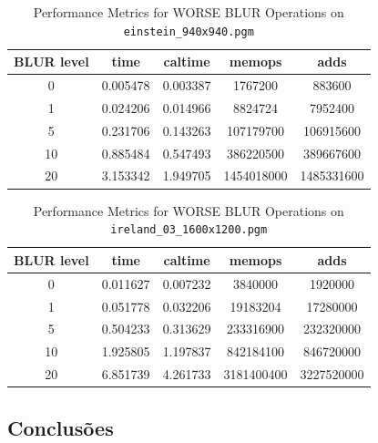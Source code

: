\documentclass{report}
\begin{document}
\begin{table}[h]
    \centering
    \begin{tabular}{ccccc}
        \toprule
        \textbf{BLUR level} & \textbf{time} & \textbf{caltime} & \textbf{memops} & \textbf{adds} \\
        \midrule
        0 & 0.005478 & 0.003387 & 1767200 & 883600 \\
        1 & 0.024206 & 0.014966 & 8824724 & 7952400 \\
        5 & 0.231706 & 0.143263 & 107179700 & 106915600 \\
        10 & 0.885484 & 0.547493 & 386220500 & 389667600 \\
        20 & 3.153342 & 1.949705 & 1454018000 & 1485331600 \\
        \bottomrule
    \end{tabular}
    \caption*{Performance Metrics for WORSE BLUR Operations on \texttt{einstein\_940x940.pgm}}
\end{table}

\begin{table}[h]
    \centering
    \begin{tabular}{ccccc}
        \toprule
        \textbf{BLUR level} & \textbf{time} & \textbf{caltime} & \textbf{memops} & \textbf{adds} \\
        \midrule
        0 & 0.011627 & 0.007232 & 3840000 & 1920000 \\
        1 & 0.051778 & 0.032206 & 19183204 & 17280000 \\
        5 & 0.504233 & 0.313629 & 233316900 & 232320000 \\
        10 & 1.925805 & 1.197837 & 842184100 & 846720000 \\
        20 & 6.851739 & 4.261733 & 3181400400 & 3227520000 \\
        \bottomrule
    \end{tabular}
    \caption*{Performance Metrics for WORSE BLUR Operations on \texttt{ireland\_03\_1600x1200.pgm}}
\end{table}


\subsection{Conclusões}

\end{document}
